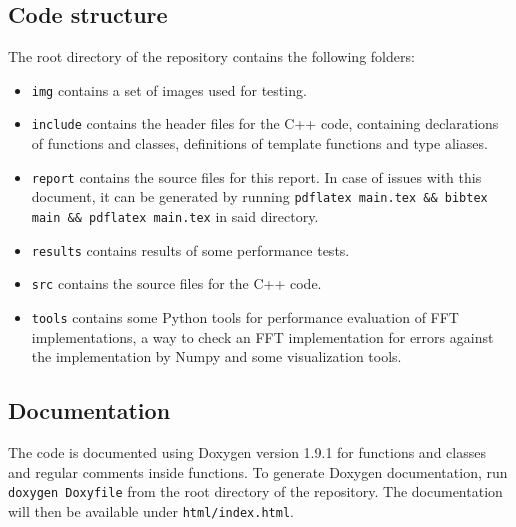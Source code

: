 \subsection{Code structure}
The root directory of the repository contains the following folders:
\begin{itemize}
    \item \texttt{img} contains a set of images used for testing.
    \item \texttt{include} contains the header files for the C++ code, containing declarations of functions and classes, definitions of template functions and type aliases.
    \item \texttt{report} contains the source files for this report. In case of issues with this document, it can be generated by running \texttt{pdflatex main.tex \&\& bibtex main \&\& pdflatex main.tex} in said directory.
    \item \texttt{results} contains results of some performance tests.
    \item \texttt{src} contains the source files for the C++ code.
    \item \texttt{tools} contains some Python tools for performance evaluation of FFT implementations, a way to check an FFT implementation for errors against the implementation by Numpy and some visualization tools.
\end{itemize}

\subsection{Documentation}
The code is documented using Doxygen version 1.9.1 for functions and classes and regular comments inside functions. To generate Doxygen documentation, run \texttt{doxygen Doxyfile} from the root directory of the repository. The documentation will then be available under \texttt{html/index.html}.